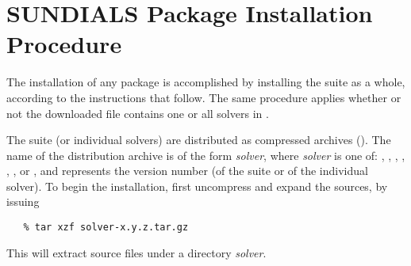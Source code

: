 \chapter{SUNDIALS Package Installation Procedure}\label{c:install}

The installation of any {\sundials} package is accomplished by installing the
{\sundials} suite as a whole, according to the instructions that
follow. The same procedure applies whether or not the downloaded
file contains one or all solvers in {\sundials}.

The {\sundials} suite (or individual solvers) are distributed as
compressed archives (). The name of the distribution
archive is of the form {\em solver}, where {\em solver}
is one of: , , , , ,
, or , and  represents the version number
(of the {\sundials} suite or of the individual solver).
To begin the installation, first uncompress and expand the sources, by issuing
\begin{verbatim}
   % tar xzf solver-x.y.z.tar.gz
\end{verbatim}
This will extract source files under a directory {\em solver}.

